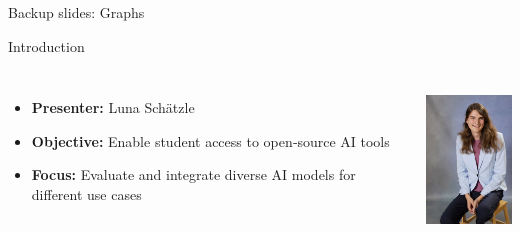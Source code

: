 \documentclass{beamer}
\begin{document}
\begin{frame}[plain]
  \centering
  \vspace{1cm}
  \Huge Backup slides: Graphs
\end{frame}

\begin{frame}
  \maketitle
\end{frame}

\begin{frame}{Introduction}
  \begin{columns}
      \begin{itemize}
        \item \textbf{Presenter:} Luna Schätzle 
        \item \textbf{Objective:} Enable student access to open‑source AI tools
        \item \textbf{Focus:} Evaluate and integrate diverse AI models for different use cases
      \end{itemize}
      \centering
      \includegraphics[height=4cm,keepaspectratio]{Luna-Schaetzle.jpg} %
  \end{columns}
\end{frame}
\end{document}
